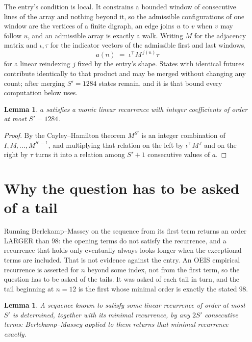 \documentclass[11pt,a4paper]{article}
\theoremstyle{plain}
\newtheorem{lemma}[theorem]{Lemma}
\theoremstyle{definition}
\begin{document}
The entry's condition is local. It constrains a bounded window of consecutive lines of the
array and nothing beyond it, so the admissible configurations of one window are the vertices of
a finite digraph, an edge joins $u$ to $v$ when $v$ may follow $u$, and an admissible array is
exactly a walk. Writing $M$ for the adjacency matrix and $\iota,\tau$ for the indicator vectors
of the admissible first and last windows,
\[
a(n)\;=\;\iota^{\!\top}M^{\,j(n)}\tau
\]
for a linear reindexing $j$ fixed by the entry's shape. States with identical futures
contribute identically to that product and may be merged without changing any count; after
merging $S'=1284$ states remain, and it is that bound every computation below uses.

\begin{lemma}\label{lem:cf}
$a$ satisfies a monic linear recurrence with integer coefficients of order at most $S'=1284$.
\end{lemma}

\begin{proof}
By the Cayley--Hamilton theorem $M^{S'}$ is an integer combination of $I,M,\dots,M^{S'-1}$,
and multiplying that relation on the left by $\iota^{\!\top}M^{\,j}$ and on the right by
$\tau$ turns it into a relation among $S'+1$ consecutive values of $a$.
\end{proof}

\section{Why the question has to be asked of a tail}

Running Berlekamp--Massey on the sequence from its first term returns an order LARGER than $98$: the opening terms do not satisfy the recurrence, and a recurrence that holds only eventually always looks longer when the exceptional terms are included. That is not evidence against the entry. An OEIS empirical recurrence is asserted for $n$ beyond some index, not from the first term, so the question has to be asked of the tails. It was asked of each tail in turn, and the tail beginning at $n=12$ is the first whose minimal order is exactly the stated $98$.

\begin{lemma}\label{lem:bm}
A sequence known to satisfy some linear recurrence of order at most $S'$ is determined,
together with its minimal recurrence, by any $2S'$ consecutive terms: Berlekamp--Massey applied
to them returns that minimal recurrence exactly.
\end{lemma}
\end{document}
